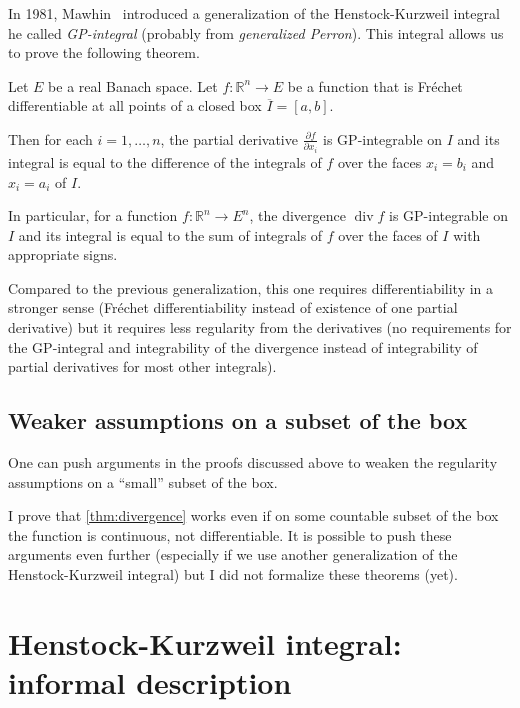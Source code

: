 \documentclass[a4paper,UKenglish,cleveref, autoref, thm-restate]{lipics-v2021}
\newcommand{\bbR}{\mathbb{R}}
\DeclareMathOperator{\divg}{div}
\begin{document}
In 1981, Mawhin~\cite{Mawhin81} introduced a generalization of the
Henstock-Kurzweil integral he called \emph{GP-integral} (probably from
\emph{generalized Perron}). This integral allows us to prove the
following theorem.

\begin{theorem}%
  [see~\cite{Mawhin81}]%
  \label{thm:divergence}
  Let \(E\) be a real Banach space. Let \(f\colon \bbR^{n}\to E\) be a
  function that is Fréchet differentiable at all points of a closed
  box \(\overline I=[a, b]\).

  Then for each \(i=1,\dots,n\), the partial derivative
  \(\frac{\partial f}{\partial x_{i}}\) is GP-integrable on \(I\) and
  its integral is equal to the difference of the integrals of \(f\) over
  the faces \(x_{i}=b_{i}\) and \(x_{i}=a_{i}\) of \(I\).

  In particular, for a function \(f\colon \bbR^{n}\to E^{n}\), the
  divergence \(\divg f\) is GP-integrable on \(I\) and its integral is
  equal to the sum of integrals of \(f\) over the faces of \(I\) with
  appropriate signs.
\end{theorem}

Compared to the previous generalization, this one requires
differentiability in a stronger sense (Fréchet differentiability
instead of existence of one partial derivative) but it requires less
regularity from the derivatives (no requirements for the GP-integral
and integrability of the divergence instead of integrability of
partial derivatives for most other integrals).

\subsection{Weaker assumptions on a subset of the box}

One can push arguments in the proofs discussed above to weaken the
regularity assumptions on a “small” subset of the box.

I prove that \autoref{thm:divergence} works even if on some countable
subset of the box the function is continuous, not differentiable. It
is possible to push these arguments even further (especially if we use
another generalization of the Henstock-Kurzweil integral) but I did
not formalize these theorems (yet).

\section{Henstock-Kurzweil integral: informal description}\label{sec:henst-kurzw-informal}
\end{document}
